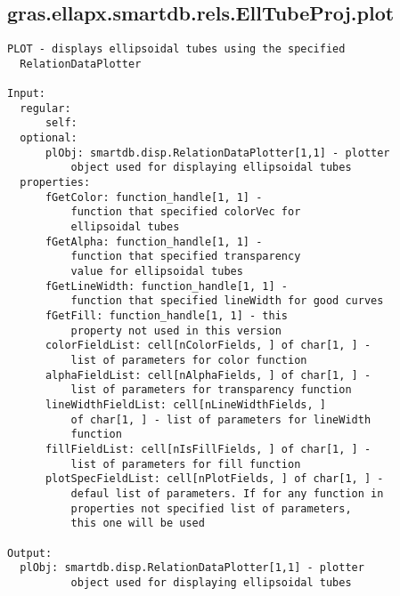 \subsection{\texorpdfstring{gras.ellapx.smartdb.rels.EllTubeProj.plot}{plot}}\label{method:gras.ellapx.smartdb.rels.EllTubeProj.plot}
\begin{verbatim}
PLOT - displays ellipsoidal tubes using the specified
  RelationDataPlotter

Input:
  regular:
      self:
  optional:
      plObj: smartdb.disp.RelationDataPlotter[1,1] - plotter
          object used for displaying ellipsoidal tubes
  properties:
      fGetColor: function_handle[1, 1] -
          function that specified colorVec for
          ellipsoidal tubes
      fGetAlpha: function_handle[1, 1] -
          function that specified transparency
          value for ellipsoidal tubes
      fGetLineWidth: function_handle[1, 1] -
          function that specified lineWidth for good curves
      fGetFill: function_handle[1, 1] - this
          property not used in this version
      colorFieldList: cell[nColorFields, ] of char[1, ] -
          list of parameters for color function
      alphaFieldList: cell[nAlphaFields, ] of char[1, ] -
          list of parameters for transparency function
      lineWidthFieldList: cell[nLineWidthFields, ]
          of char[1, ] - list of parameters for lineWidth
          function
      fillFieldList: cell[nIsFillFields, ] of char[1, ] -
          list of parameters for fill function
      plotSpecFieldList: cell[nPlotFields, ] of char[1, ] -
          defaul list of parameters. If for any function in
          properties not specified list of parameters,
          this one will be used

Output:
  plObj: smartdb.disp.RelationDataPlotter[1,1] - plotter
          object used for displaying ellipsoidal tubes
\end{verbatim}
